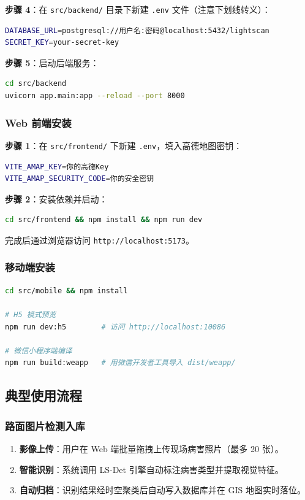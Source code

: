 \documentclass[UTF8, a4paper, fontset=ubuntu]{ctexart}
\begin{document}
\noindent\textbf{步骤 4}：在 \texttt{src/backend/} 目录下新建 \texttt{.env} 文件（注意下划线转义）：
\begin{lstlisting}[language=bash]
DATABASE_URL=postgresql://用户名:密码@localhost:5432/lightscan
SECRET_KEY=your-secret-key
\end{lstlisting}

\noindent\textbf{步骤 5}：启动后端服务：
\begin{lstlisting}[language=bash]
cd src/backend
uvicorn app.main:app --reload --port 8000
\end{lstlisting}

\subsubsection{Web 前端安装}

\noindent\textbf{步骤 1}：在 \texttt{src/frontend/} 下新建 \texttt{.env}，填入高德地图密钥：
\begin{lstlisting}[language=bash]
VITE_AMAP_KEY=你的高德Key
VITE_AMAP_SECURITY_CODE=你的安全密钥
\end{lstlisting}

\noindent\textbf{步骤 2}：安装依赖并启动：
\begin{lstlisting}[language=bash]
cd src/frontend && npm install && npm run dev
\end{lstlisting}
完成后通过浏览器访问 \texttt{http://localhost:5173}。

\subsubsection{移动端安装}
\begin{lstlisting}[language=bash]
cd src/mobile && npm install

# H5 模式预览
npm run dev:h5        # 访问 http://localhost:10086

# 微信小程序端编译
npm run build:weapp   # 用微信开发者工具导入 dist/weapp/
\end{lstlisting}

\subsection{典型使用流程}

\subsubsection{路面图片检测入库}
\begin{enumerate}[label=\arabic*., nosep]
    \item \textbf{影像上传}：用户在 Web 端批量拖拽上传现场病害照片（最多 20 张）。
    \item \textbf{智能识别}：系统调用 LS-Det 引擎自动标注病害类型并提取视觉特征。
    \item \textbf{自动归档}：识别结果经时空聚类后自动写入数据库并在 GIS 地图实时落位。
\end{enumerate}
\end{document}
